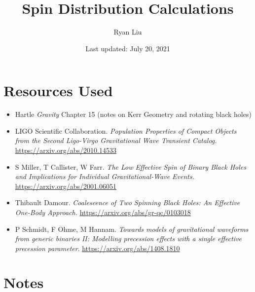 \documentclass{article}
\title{Spin Distribution Calculations}
\author{Ryan Liu}
\date{Last updated: July 20, 2021}
\begin{document}
\maketitle

\section{Resources Used}

\begin{itemize}
    \item Hartle \textit{Gravity} Chapter 15 (notes on Kerr Geometry and rotating black holes)
    \item LIGO Scientific Collaboration. \textit{Population Properties of Compact Objects from the Second Ligo-Virgo Gravitational Wave Transient Catalog.} \url{https://arxiv.org/abs/2010.14533}
    \item S Miller, T Callister, W Farr. \textit{The Low Effective Spin of Binary Black Holes and Implications for Individual Gravitational-Wave Events.} \url{https://arxiv.org/abs/2001.06051}
    \item Thibault Damour. \textit{Coalescence of Two Spinning Black Holes: An Effective One-Body Approach.} \url{https://arxiv.org/abs/gr-qc/0103018}
    \item P Schmidt, F Ohme, M Hannam. \textit{Towards models of gravitational waveforms from generic binaries II: Modelling precession effects with a single effective precession parameter}. \url{https://arxiv.org/abs/1408.1810}
\end{itemize}

\section{Notes}
\end{document}
